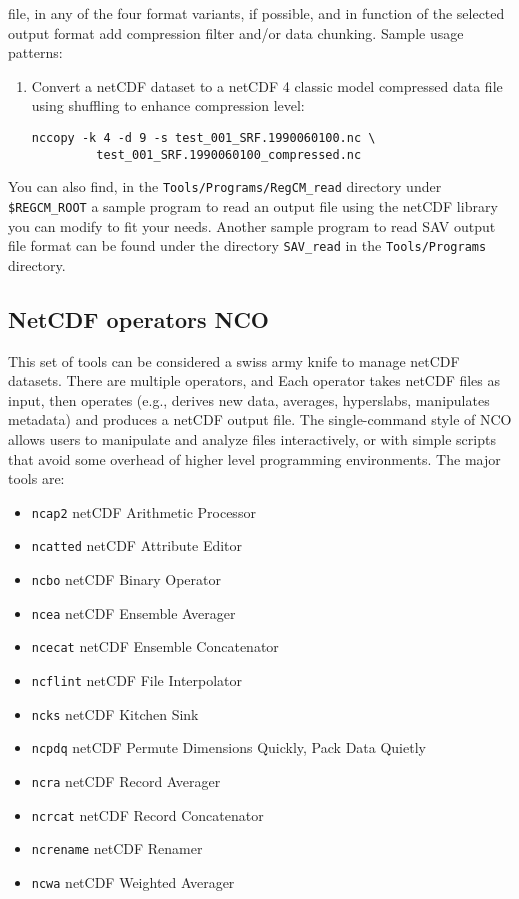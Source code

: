 \begin{itemize}
file, in any of the four format variants, if possible, and in function of
the selected output format add compression filter and/or data chunking.
Sample usage patterns:
\begin{enumerate}
\item Convert a netCDF dataset to a netCDF 4 classic model compressed
data file using shuffling to enhance compression level:
\begin{Verbatim}
nccopy -k 4 -d 9 -s test_001_SRF.1990060100.nc \
         test_001_SRF.1990060100_compressed.nc
\end{Verbatim}
\end{enumerate}
\end{itemize}

You can also find, in the \verb=Tools/Programs/RegCM_read= directory
under \verb=$REGCM_ROOT= a sample program to read an output file using
the netCDF library you can modify to fit your needs.
Another sample program to read SAV output file format can be found
under the directory \verb=SAV_read= in the \verb=Tools/Programs= directory.

\subsection{NetCDF operators NCO}

This set of tools can be considered a swiss army knife to manage netCDF
datasets. There are multiple operators, and Each operator takes netCDF
files as input, then operates (e.g., derives new data, averages, hyperslabs,
manipulates metadata) and produces a netCDF output file.
The single-command style of NCO allows users to manipulate and analyze files
interactively, or with simple scripts that avoid some overhead of higher level
programming environments.
The major tools are:
\begin{itemize}
\item \verb=ncap2= netCDF Arithmetic Processor 
\item \verb=ncatted= netCDF Attribute Editor
\item \verb=ncbo= netCDF Binary Operator
\item \verb=ncea= netCDF Ensemble Averager
\item \verb=ncecat= netCDF Ensemble Concatenator
\item \verb=ncflint= netCDF File Interpolator
\item \verb=ncks= netCDF Kitchen Sink
\item \verb=ncpdq= netCDF Permute Dimensions Quickly, Pack Data Quietly
\item \verb=ncra= netCDF Record Averager
\item \verb=ncrcat= netCDF Record Concatenator
\item \verb=ncrename= netCDF Renamer
\item \verb=ncwa= netCDF Weighted Averager
\end{itemize}

